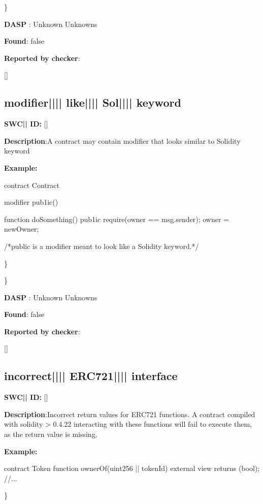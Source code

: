 \documentclass{article}
\begin{document}
\} 

\textbf{DASP} : Unknown Unknowns

\textbf{Found}: false

\textbf{Reported by checker}: 
\begin{ffcode} 

[]
\end{ffcode} 
\subsection{modifier{||\textunderscore|| }like{||\textunderscore|| }Sol{||\textunderscore|| }keyword} 
\textbf{SWC{|\textunderscore| }ID:} []

\textbf{Description}:A contract may contain modifier that looks similar to Solidity keyword


\textbf{Example:} 
\begin{ffcode} 

contract Contract{
    modifier pub1ic() {
    }

    function doSomething() pub1ic {
        require(owner == msg.sender);
        owner = newOwner;
    }
}

 /*public is a modifier meant to look like a Solidity keyword.*/ 

\end{ffcode} 
\} 

\} 

\textbf{DASP} : Unknown Unknowns

\textbf{Found}: false

\textbf{Reported by checker}: 
\begin{ffcode} 

[]
\end{ffcode} 
\subsection{incorrect{||\textunderscore|| }ERC721{||\textunderscore|| }interface} 
\textbf{SWC{|\textunderscore| }ID:} []

\textbf{Description}:Incorrect return values for ERC721 functions. A contract compiled with solidity > 0.4.22 interacting with these functions will fail to execute them, as the return value is missing.


\textbf{Example:} 
\begin{ffcode} 

contract Token{
    function ownerOf(uint256 |\textunderscore| tokenId) external view returns (bool);
    //...
}

\end{ffcode} 
\} 
\end{document}
